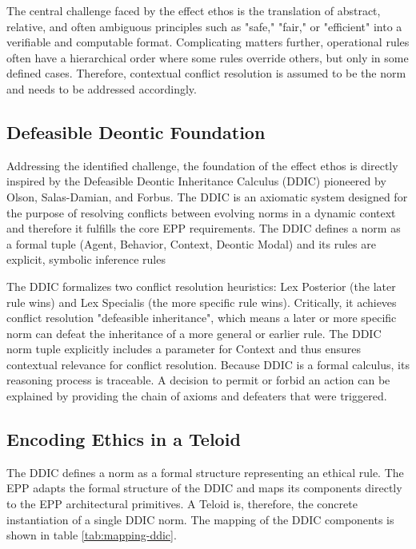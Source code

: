 The central challenge faced by the effect ethos is the translation of abstract, relative, and often ambiguous principles such as "safe," "fair," or "efficient" into a verifiable and computable format. Complicating matters further, operational rules often have a hierarchical order where some rules override others, but only in some defined cases. Therefore, contextual conflict resolution is assumed to be the norm and needs to be addressed accordingly. 

\subsection{Defeasible Deontic Foundation}


Addressing the identified challenge, the foundation of the effect ethos is directly inspired by the Defeasible Deontic Inheritance Calculus\cite{olson2024DDIC} (DDIC) pioneered by Olson, Salas-Damian, and Forbus. The DDIC is an axiomatic system designed for the purpose of resolving conflicts between evolving norms in a dynamic context and therefore it fulfills the core EPP requirements. The DDIC defines a norm as a formal tuple (Agent, Behavior, Context, Deontic Modal) and its rules are explicit, symbolic inference rules

The DDIC formalizes two conflict resolution heuristics: Lex Posterior (the later rule wins) and Lex Specialis (the more specific rule wins).  Critically, it achieves conflict resolution "defeasible inheritance", which means a later or more specific norm can defeat the inheritance of a more general or earlier rule. The DDIC norm tuple explicitly includes a parameter for Context and thus ensures contextual relevance for conflict resolution. Because DDIC is a formal calculus, its reasoning process is traceable. A decision to permit or forbid an action can be explained by providing the chain of axioms and defeaters that were triggered\cite{olson2024DDIC}. 

\subsection{Encoding Ethics in a Teloid}

The DDIC defines a norm as a formal structure representing an ethical rule. The EPP adapts the formal structure of the DDIC and maps its components directly to the EPP architectural primitives. A Teloid is, therefore, the concrete instantiation of a single DDIC norm. The mapping of the DDIC components is shown in table \ref{tab:mapping-ddic}. 


